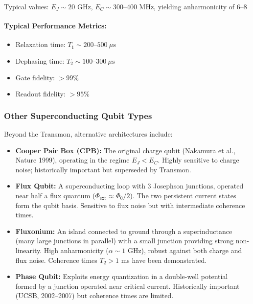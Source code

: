 \documentclass{article}
\begin{document}
Typical values: $E_J \sim 20$ GHz, $E_C \sim 300\text{--}400$ MHz, yielding anharmonicity of 6–8%

\paragraph{Typical Performance Metrics:}
\begin{itemize}
    \item Relaxation time: $T_1 \sim 200\text{--}500~\mu\text{s}$
    \item Dephasing time: $T_2 \sim 100\text{--}300~\mu\text{s}$
    \item Gate fidelity: $> 99\%$
    \item Readout fidelity: $> 95\%$
\end{itemize}

\subsubsection*{Other Superconducting Qubit Types}

Beyond the Transmon, alternative architectures include:

\begin{itemize}
    \item \textbf{Cooper Pair Box (CPB):} The original charge qubit (Nakamura et al., Nature 1999), operating in the regime $E_J < E_C$. Highly sensitive to charge noise; historically important but superseded by Transmon.
    
    \item \textbf{Flux Qubit:} A superconducting loop with 3 Josephson junctions, operated near half a flux quantum ($\Phi_{\text{ext}} \approx \Phi_0/2$). The two persistent current states form the qubit basis. Sensitive to flux noise but with intermediate coherence times.
    
    \item \textbf{Fluxonium:} An island connected to ground through a superinductance (many large junctions in parallel) with a small junction providing strong non-linearity. High anharmonicity ($\alpha \sim 1$ GHz), robust against both charge and flux noise. Coherence times $T_2 > 1$ ms have been demonstrated.
    
    \item \textbf{Phase Qubit:} Exploits energy quantization in a double-well potential formed by a junction operated near critical current. Historically important (UCSB, 2002–2007) but coherence times are limited.
\end{itemize}
\end{document}

